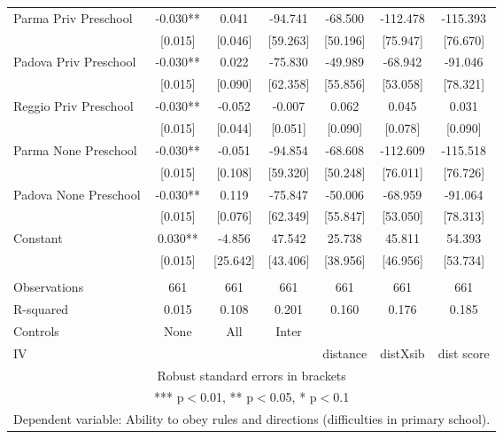 \begin{tabular}{lcccccc}
Parma Priv Preschool & -0.030** & 0.041 & -94.741 & -68.500 & -112.478 & -115.393 \\
 & [0.015] & [0.046] & [59.263] & [50.196] & [75.947] & [76.670] \\
Padova Priv Preschool & -0.030** & 0.022 & -75.830 & -49.989 & -68.942 & -91.046 \\
 & [0.015] & [0.090] & [62.358] & [55.856] & [53.058] & [78.321] \\
Reggio Priv Preschool & -0.030** & -0.052 & -0.007 & 0.062 & 0.045 & 0.031 \\
 & [0.015] & [0.044] & [0.051] & [0.090] & [0.078] & [0.090] \\
Parma None Preschool & -0.030** & -0.051 & -94.854 & -68.608 & -112.609 & -115.518 \\
 & [0.015] & [0.108] & [59.320] & [50.248] & [76.011] & [76.726] \\
Padova None Preschool & -0.030** & 0.119 & -75.847 & -50.006 & -68.959 & -91.064 \\
 & [0.015] & [0.076] & [62.349] & [55.847] & [53.050] & [78.313] \\
Constant & 0.030** & -4.856 & 47.542 & 25.738 & 45.811 & 54.393 \\
 & [0.015] & [25.642] & [43.406] & [38.956] & [46.956] & [53.734] \\
 &  &  &  &  &  &  \\
Observations & 661 & 661 & 661 & 661 & 661 & 661 \\
R-squared & 0.015 & 0.108 & 0.201 & 0.160 & 0.176 & 0.185 \\
Controls & None & All & Inter &  &  &  \\
 IV &  &  &  & distance & distXsib & dist score \\ \hline
\multicolumn{7}{c}{ Robust standard errors in brackets} \\
\multicolumn{7}{c}{ *** p$<$0.01, ** p$<$0.05, * p$<$0.1} \\
\multicolumn{7}{c}{ Dependent variable: Ability to obey rules and directions (difficulties in primary school).} \\
\end{tabular}
